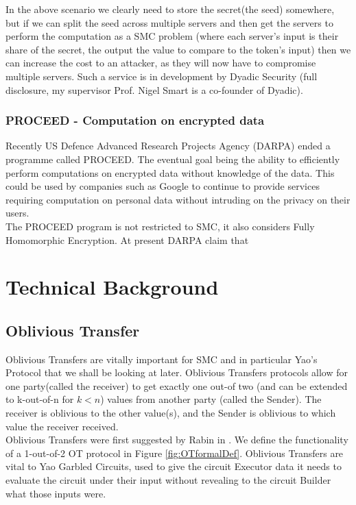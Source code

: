 \documentclass[ %
                    author={Nicholas Tutte},
                supervisor={Prof. Nigel Smart},
                    degree={MEng},
                     title={Secure Two Party Computation},
                  subtitle={A practical comparison of recent protocols},
                      type={Research - GG1K},
                      year={2015} ]{dissertation}
\begin{document}
				In the above scenario we clearly need to store the secret(the seed) somewhere, but if we can split the seed across multiple servers and then get the servers to perform the computation as a SMC problem (where each server's input is their share of the secret, the output the value to compare to the token's input) then we can increase the cost to an attacker, as they will now have to compromise multiple servers. Such a service is in development by Dyadic Security (full disclosure, my supervisor Prof. Nigel Smart is a co-founder of Dyadic).

			\subsection{PROCEED - Computation on encrypted data} \label{sub2:PROCEED_DARPA}
				Recently US Defence Advanced Research Projects Agency (DARPA) ended a programme called PROCEED. The eventual goal being the ability to efficiently perform computations on encrypted data without knowledge of the data. This could be used by companies such as Google to continue to provide services requiring computation on personal data without intruding on the privacy on their users.\\

				The PROCEED program is not restricted to SMC, it also considers Fully Homomorphic Encryption. At present DARPA claim that 


	
	\chapter{Technical Background}
		\section{Oblivious Transfer} \label{sec:OT_Intro}
			Oblivious Transfers are vitally important for SMC and in particular Yao's Protocol that we shall be looking at later. Oblivious Transfers protocols allow for one party(called the receiver) to get exactly one out-of two (and can be extended to k-out-of-n for $k < n$) values from another party (called the Sender). The receiver is oblivious to the other value(s), and the Sender is oblivious to which value the receiver received.\\

			Oblivious Transfers were first suggested by Rabin in \cite{Rabin81}. We define the functionality of a 1-out-of-2 OT protocol in Figure \ref{fig:OTformalDef}. Oblivious Transfers are vital to Yao Garbled Circuits, used to give the circuit Executor data it needs to evaluate the circuit under their input without revealing to the circuit Builder what those inputs were.\\
\end{document}
